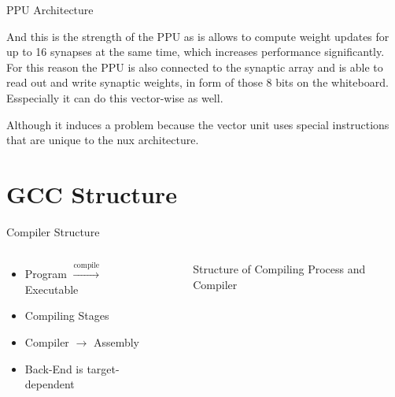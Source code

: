 \documentclass[10pt,aspectratio=169]{beamer}
\begin{document}
\begin{frame}{PPU Architecture}
{		And this is the strength of the PPU as is allows to compute weight updates for up to 16 synapses at the same time, which increases performance significantly. 
		For this reason the PPU is also connected to the synaptic array and is able to read out and write synaptic weights, in form of those 8 bits on the whiteboard.
		Esspecially it can do this vector-wise as well.

		Although it induces a problem because the vector unit uses special instructions that are unique to the nux architecture.
}
\end{frame}



\section{GCC Structure}
\begin{frame}[fragile]{Compiler Structure}
    \begin{columns}[c]
    \begin{column}{0.5\textwidth}
        \begin{itemize}
			\setlength\itemsep{1em}
            \item Program $\xrightarrow{\text{compile}}$ Executable
			\item Compiling Stages
			\item Compiler $\rightarrow$ Assembly
			\item Back-End is target-dependent
        \end{itemize}
    \end{column}

    \begin{column}{0.5\textwidth}
        \centering
        \begin{figure}
            \begin{adjustbox}{center, max width={.6\columnwidth}}
				
				
            \end{adjustbox}
            \caption{\label{fig:compiler} Structure of Compiling Process and Compiler}
        \end{figure}
    \end{column}
    \end{columns}
\end{frame}
\end{document}
